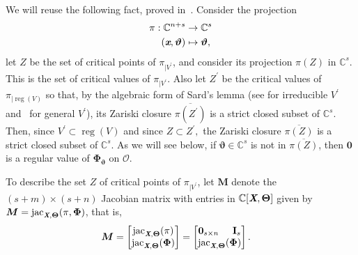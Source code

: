 \documentclass[a4paper]{article}
\def\sO{\mathscr{O}}
\def\Xb{\textit{\textbf{X}}}
\def\Thetab{\bm{\Theta}}
\def\thetab{\bm{\vartheta}}
\def\xb{\textit{\textbf{x}}}
\DeclareMathOperator{\jac}{jac}
\DeclareMathOperator{\reg}{reg}
\def\dt{s}
\def\C{\mathbb{C}}
\def\bbm{\begin{bmatrix}}
\def\ebm{\end{bmatrix}}
\begin{document}
    We will reuse the following fact, proved in~\cite{TWT}.  Consider the
    projection 
    \begin{align*}
    \pi: \C^{n+\dt} &\rightarrow\C^{\dt} \\
    (\xb, \thetab)&\mapsto\thetab, 
    \end{align*}
    let $Z$ be the set of critical points of
    $\pi_{|V^{'}}$, and consider its projection $\pi(Z)$ in $\C^s$. This is
    the set of critical values of $\pi_{|V^{'}}$. Also let $Z^{'}$ be the critical values of $\pi_{|\reg(V)}$ so that, by the algebraic form
    of Sard's lemma (see \cite[Theorem~3.7]{Mumford76} for irreducible $V^{'}$
    and~\cite[Proposition~B.2]{TWT} for general $V^{'}$), its Zariski closure
    $\overline{\pi(Z^{'})}$ is a strict closed subset of $\C^s$. Then, since $V^{'} \subset \reg(V)$ and since $Z \subset Z^{'},$ the Zariski closure $\overline{\pi(Z)}$ is a strict closed subset of $\C^s$.  As we will
    see below, if $\thetab \in \C^{\dt}$ is not in $\overline{\pi(Z)}$,
    then $\bm 0$ is a regular value of $\bm\Phi_{\thetab}$ on $\sO.$
    
    To describe the set $Z$ of critical points of $\pi_{|V^{'}}$, let $\bm M$
    denote the $(s+m) \times (s+n)$ Jacobian matrix with entries in
    $\C[\Xb,\Thetab]$ given by $\bm M = \jac_{\Xb,\Thetab}(\pi,\bm\Phi)$,
    that is,
    \begin{align*}
    \bm M &= 
    \bbm 
    \jac_{\Xb,\Thetab}(\pi)\\
    \jac_{\Xb,\Thetab}(\bm\Phi) 
    \ebm 
    =
    \bbm 
    \textbf{0}_{\dt \times n}\hspace{5mm}\textbf{I}_{\dt} \\
    \jac_{\Xb,\Thetab}(\bm\Phi)
    \ebm.
    \end{align*}
\end{document}
